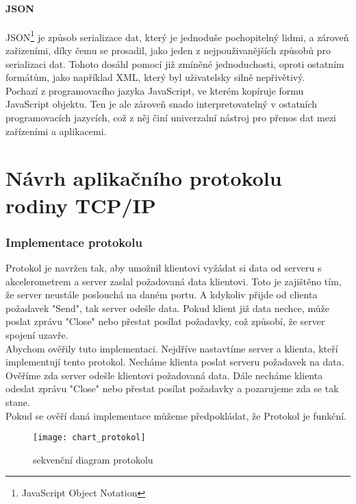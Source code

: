 \documentclass[12pt]{report}			%
\begin{document}
\cite{DHCP1}
\cite{DHCP2}
\cite{DHCP3}
\cite{DHCP4}


				\subsection{JSON}
JSON\footnote{JavaScript Object Notation} je způsob serializace dat, který je jednoduše pochopitelný lidmi, a zároveň zařizeními, díky čemu se prosadil, jako jeden z nejpouživanějších způsobů pro serializaci dat. Tohoto dosáhl pomocí již zmíněné jednoduchosti, oproti ostatním formátům, jako například XML, který byl uživatelsky silně nepřivětivý. 
\\
Pochazí z programovacího jazyka JavaScript, ve kterém kopíruje formu JavaScript objektu. Ten je ale zároveň snado interpretovatelný v ostatních programovacích jazycích, což z něj činí univerzalní nástroj pro přenos dat mezi zařízeními a aplikacemi. 

\cite{JSON1}
\cite{JSON2}
\cite{JSON3}
\cite{JSON4}


			

	\part{Návrh aplikačního protokolu rodiny TCP/IP}



\section{Implementace protokolu}
Protokol je navržen tak, aby umožnil klientovi vyžádat si data od serveru s akcelerometrem a server zaslal požadovaná data klientovi. Toto je zajištěno tím, že server neustále poslouchá na daném portu. A kdykoliv přijde od clienta požadavek "Send", tak server odešle data. Pokud klient již data nechce, může poslat zprávu "Close" nebo přestat posílat požadavky, což způsobí, že server spojení uzavře.
\\
Abychom ověřily tuto implementaci. Nejdříve nastavtíme server a klienta, kteří implementují tento protokol. Necháme klienta poslat serveru požadavek na data. Ověříme zda server odešle klientovi požadovaná data. Dále necháme klienta odeslat zprávu "Close" nebo přestat posílat požadavky a pozarujeme zda se tak stane.
\\
Pokud se ověří daná implementace můžeme předpokládat, že Protokol je funkční.
\\

\begin{figure}[h]
\caption{sekvenční diagram protokolu}
\centering
 \texttt{[image: chart\_protokol]}
\end{figure}
\end{document}
